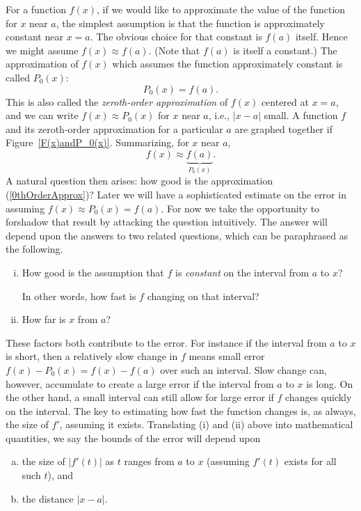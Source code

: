 For a function $f(x)$, if we would like to approximate the value
of the function for $x$ near $a$, the simplest assumption
is that the function is approximately constant near $x=a$.
The obvious choice for that constant is $f(a)$ itself.
Hence we might assume $f(x)\approx f(a)$.  (Note that $f(a)$
is itself a constant.)  The approximation of $f(x)$ which
assumes the function approximately constant is called $P_0(x)$:
\begin{equation}
P_0(x)=f(a).\label{DefinitionOfP0}
\end{equation}
This is also called the {\it zeroth-order approximation} of $f(x)$
centered at $x=a$, and we can write $f(x)\approx P_0(x)$ for $x$
near $a$, i.e., $|x-a|$ small.  A function $f$ and its
zeroth-order approximation for a particular $a$ are graphed together
if Figure~\ref{F(x)andP_0(x)}.
Summarizing, for $x$ near $a$, 
\begin{equation}
f(x)\approx \underbrace{f(a)}_{P_0(x)}.\label{0thOrderApprox}\end{equation}
A natural question then arises:  how good is the approximation
(\ref{0thOrderApprox})? 
Later we will have a sophisticated estimate on the error in assuming 
$f(x)\approx P_0(x)=f(a)$.  For now we take the opportunity to forshadow
that result by attacking the question intuitively.  
The answer will depend upon the answers to
two related questions, which can be paraphrased
as the  following.
\begin{enumerate}[(i)]
\item How good is the assumption that $f$ is {\it constant} on the interval
      from $a$ to $x$?

      In other words, how fast is $f$ changing on that interval?
      
\item How far is $x$ from $a$?
\end{enumerate}
These factors both contribute to the error.  For instance if the interval
from $a$ to $x$ is short, 
then a relatively slow change in $f$ means small error
$f(x)-P_0(x)=f(x)-f(a)$ over such an interval. Slow change can, however,
accumulate to create a large error if the interval from $a$ to $x$ is long.
On the other hand, a small interval can still 
allow for large error if $f$ changes
quickly on the interval.  The key to estimating how fast the function
changes is, as always, the size of $f'$, assuming it exists.  
Translating (i) and (ii)
above into mathematical quantities, we say the bounds of the error
will depend upon
\begin{enumerate}[(a)]
\item the size of $|f'(t)|$ as $t$ ranges from $a$ to $x$ (assuming
      $f'(t)$ exists for all such $t$), and
\item the distance $|x-a|$.
\end{enumerate}

